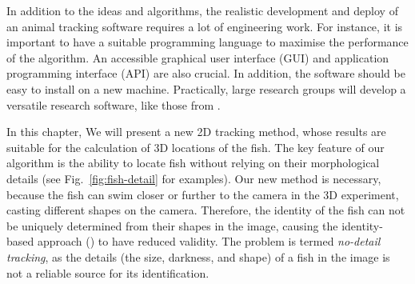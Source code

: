 \documentclass[11pt,twoside]{report}
\begin{document}
In addition to the ideas and algorithms, the realistic development and deploy of an animal tracking software requires a lot of engineering work. For instance, it is important to have a suitable programming language to maximise the performance of the algorithm. An accessible graphical user interface (\gls{GUI}) and application programming interface (\gls{API}) are also crucial. In addition, the software should be easy to install on a new machine. Practically, large research groups will develop a versatile research software, like those from \citeauthor{walter2021} \cite{walter2021}.


In this chapter, We will present a new 2D tracking method, whose results are suitable for the calculation of 3D locations of the fish. The key feature of our algorithm is the ability to locate fish without relying on their morphological details (see Fig.~\ref{fig:fish-detail} for examples).
Our new method is necessary, because the fish can swim closer or further to the camera in the 3D experiment, casting different shapes on the camera.
Therefore, the identity of the fish can not be uniquely determined from their shapes in the image, causing the identity-based approach (\cite{perez-escudero2014, romero-ferrero2019, walter2021}) to have reduced validity. The problem is termed \emph{no-detail tracking}, as the details (the size, darkness, and shape) of a fish in the image is not a reliable source for its identification.

\end{document}
